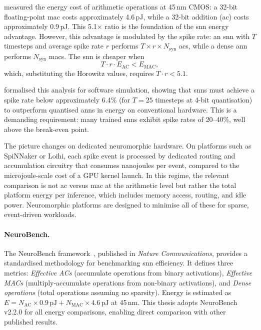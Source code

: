 \citet{horowitz2014} measured the energy cost of arithmetic operations at 45\,nm CMOS: a 32-bit floating-point \gls{mac} costs approximately 4.6\,pJ, while a 32-bit addition (\gls{ac}) costs approximately 0.9\,pJ. This 5.1$\times$ ratio is the foundation of the \gls{snn} energy advantage. However, this advantage is modulated by the spike rate: an \gls{snn} with $T$ timesteps and average spike rate $r$ performs $T \times r \times N_{\mathrm{syn}}$ \glspl{ac}, while a dense \gls{ann} performs $N_{\mathrm{syn}}$ \glspl{mac}. The \gls{snn} is cheaper when
\begin{equation}
    T \cdot r \cdot E_{\mathrm{AC}} < E_{\mathrm{MAC}},
    \label{eq:energy-crossover}
\end{equation}
which, substituting the Horowitz values, requires $T \cdot r < 5.1$.

\citet{dampfhoffer2023} formalised this analysis for software simulation, showing that \glspl{snn} must achieve a spike rate below approximately 6.4\% (for $T = 25$ timesteps at 4-bit quantisation) to outperform quantised \glspl{ann} in energy on conventional hardware. This is a demanding requirement: many trained \glspl{snn} exhibit spike rates of 20--40\%, well above the break-even point.

The picture changes on dedicated neuromorphic hardware. On platforms such as SpiNNaker or Loihi, each spike event is processed by dedicated routing and accumulation circuitry that consumes nanojoules per event, compared to the microjoule-scale cost of a GPU kernel launch. In this regime, the relevant comparison is not \gls{ac} versus \gls{mac} at the arithmetic level but rather the total platform energy per inference, which includes memory access, routing, and idle power. Neuromorphic platforms are designed to minimise all of these for sparse, event-driven workloads.

\paragraph{NeuroBench.}
The NeuroBench framework~\citep{yik2025}, published in \emph{Nature Communications}, provides a standardised methodology for benchmarking \gls{snn} efficiency. It defines three metrics: \emph{Effective ACs} (accumulate operations from binary activations), \emph{Effective MACs} (multiply-accumulate operations from non-binary activations), and \emph{Dense operations} (total operations assuming no sparsity). Energy is estimated as $E = N_{\mathrm{AC}} \times 0.9\,\text{pJ} + N_{\mathrm{MAC}} \times 4.6\,\text{pJ}$ at 45\,nm. This thesis adopts NeuroBench v2.2.0 for all energy comparisons, enabling direct comparison with other published results.


